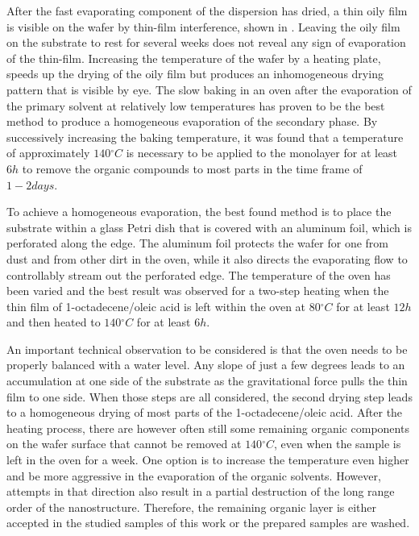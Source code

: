 \documentclass[\main/dresen_thesis.tex]{subfiles}
\begin{document}
    After the fast evaporating component of the dispersion has dried, a thin oily film is visible on the wafer by thin-film interference, shown in .
    Leaving the oily film on the substrate to rest for several weeks does not reveal any sign of evaporation of the thin-film.
    Increasing the temperature of the wafer by a heating plate, speeds up the drying of the oily film but produces an inhomogeneous drying pattern that is visible by eye.
    The slow baking in an oven after the evaporation of the primary solvent at relatively low temperatures has proven to be the best method to produce a homogeneous evaporation of the secondary phase.
    By successively increasing the baking temperature, it was found that a temperature of approximately $140 \unit{^\circ C}$ is necessary to be applied to the monolayer for at least $6 \unit{h}$ to remove the organic compounds to most parts in the time frame of $1 - 2 \unit{days}$.

    To achieve a homogeneous evaporation, the best found method is to place the substrate within a glass Petri dish that is covered with an aluminum foil, which is perforated along the edge.
    The aluminum foil protects the wafer for one from dust and from other dirt in the oven, while it also directs the evaporating flow to controllably stream out the perforated edge.
    The temperature of the oven has been varied and the best result was observed for a two-step heating when the thin film of 1-octadecene/oleic acid is left within the oven at $80 \unit{^\circ C}$ for at least $12\unit{h}$ and then heated to $140 \unit{^\circ C}$ for at least $6\unit{h}$.

    An important technical observation to be considered is that the oven needs to be properly balanced with a water level.
    Any slope of just a few degrees leads to an accumulation at one side of the substrate as the gravitational force pulls the thin film to one side.
    When those steps are all considered, the second drying step leads to a homogeneous drying of most parts of the 1-octadecene/oleic acid.
    After the heating process, there are however often still some remaining organic components on the wafer surface that cannot be removed at $140 \unit{^\circ C}$, even when the sample is left in the oven for a week.
    One option is to increase the temperature even higher and be more aggressive in the evaporation of the organic solvents.
    However, attempts in that direction also result in a partial destruction of the long range order of the nanostructure.
    Therefore, the remaining organic layer is either accepted in the studied samples of this work or the prepared samples are washed.
\end{document}
